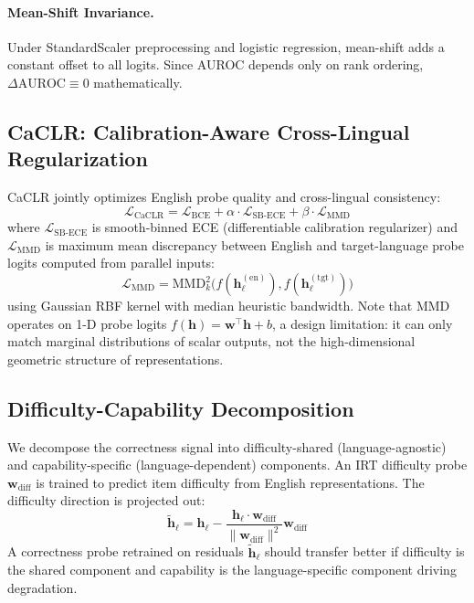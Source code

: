 \documentclass[11pt,a4paper]{article}
\begin{document}
\paragraph{Mean-Shift Invariance.}
Under StandardScaler preprocessing and logistic regression, mean-shift adds a constant offset to all logits.
Since AUROC depends only on rank ordering, $\Delta\text{AUROC} \equiv 0$ mathematically.

\subsection{CaCLR: Calibration-Aware Cross-Lingual Regularization}
\label{sec:caclr_method}

CaCLR jointly optimizes English probe quality and cross-lingual consistency:
\begin{equation}
\mathcal{L}_{\text{CaCLR}} = \mathcal{L}_{\text{BCE}} + \alpha \cdot \mathcal{L}_{\text{SB-ECE}} + \beta \cdot \mathcal{L}_{\text{MMD}}
\end{equation}
where $\mathcal{L}_{\text{SB-ECE}}$ is smooth-binned ECE (differentiable calibration regularizer) and $\mathcal{L}_{\text{MMD}}$ is maximum mean discrepancy between English and target-language probe logits computed from parallel inputs:
\begin{equation}
\mathcal{L}_{\text{MMD}} = \text{MMD}^2_k\big(f(\mathbf{h}_\ell^{(\text{en})}), f(\mathbf{h}_\ell^{(\text{tgt})})\big)
\end{equation}
using Gaussian RBF kernel with median heuristic bandwidth.
Note that MMD operates on 1-D probe logits $f(\mathbf{h}) = \mathbf{w}^\top \mathbf{h} + b$, a design limitation: it can only match marginal distributions of scalar outputs, not the high-dimensional geometric structure of representations.

\subsection{Difficulty-Capability Decomposition}
\label{sec:decomp_method}

We decompose the correctness signal into difficulty-shared (language-agnostic) and capability-specific (language-dependent) components.
An IRT difficulty probe $\mathbf{w}_{\text{diff}}$ is trained to predict item difficulty from English representations.
The difficulty direction is projected out:
\begin{equation}
\tilde{\mathbf{h}}_\ell = \mathbf{h}_\ell - \frac{\mathbf{h}_\ell \cdot \mathbf{w}_{\text{diff}}}{\|\mathbf{w}_{\text{diff}}\|^2} \mathbf{w}_{\text{diff}}
\end{equation}
A correctness probe retrained on residuals $\tilde{\mathbf{h}}_\ell$ should transfer better if difficulty is the shared component and capability is the language-specific component driving degradation.
\end{document}
